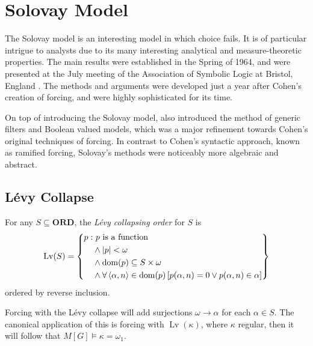 \chapter{Solovay Model}

The Solovay model is an interesting model in which choice fails.
It is of particular intrigue to analysts due to its many interesting analytical and measure-theoretic properties.
The main results were established in the Spring of 1964, and were presented at the July meeting of the Association of Symbolic Logic at Bristol, England \autocite[see footnote * in][1]{solovay1970}.
The methods and arguments were developed just a year after Cohen's creation of forcing,
and were highly sophisticated for its time.

On top of introducing the Solovay model, \autocite{solovay1970} also introduced the method of generic filters and Boolean valued models,
which was a major refinement towards Cohen's original techniques of forcing.
In contrast to Cohen's syntactic approach, known as ramified forcing, Solovay's methods were noticeably more algebraic and abstract.

\section{Lévy Collapse}

\newcommand*{\Lv}{\operatorname{Lv}}
\begin{definition}
    For any \(S\subseteq \mathbf{ORD}\), the \emph{Lévy collapsing order} for \(S\) is
    \[
        \Lv(S) = \set{
            \begin{split}
                p: &\ p\text{ is a function} \\
                   &\land \abs{p} < \omega \\
                   &\land \dom(p) \subseteq S\times\omega \\
                   &\land \forall \Angle{\alpha,n}\in\dom(p)\sq{p(\alpha,n) = 0 \lor p(\alpha,n)\in \alpha}
            \end{split}
        }
    \]
    ordered by reverse inclusion.
\end{definition}
\begin{remark}
    Forcing with the Lévy collapse will add surjections \(\omega\to\alpha\) for each \(\alpha\in S\).
    The canonical application of this is forcing with \(\Lv(\kappa)\), where \(\kappa\) regular,
    then it will follow that \(M[G]\models \kappa = \omega_1\).
\end{remark}

